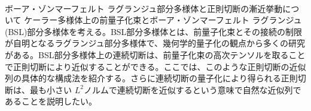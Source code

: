 \documentclass[dvipdfmx,a4paper,12pt]{article}
\theoremstyle{plain} %
\theoremstyle{definition} %
\begin{document}
\\
ボーア・ゾンマーフェルト ラグランジュ部分多様体と正則切断の漸近挙動について
\vskip3mm
ケーラー多様体上の前量子化束とボーア・ゾンマーフェルト ラグランジュ(BSL)部分多様体を考える。BSL部分多様体とは、前量子化束とその接続の制限が自明となるラグランジュ部分多様体で、幾何学的量子化の観点から多くの研究がある。BSL部分多様体上の連続切断は、前量子化束の高次テンソルを取ることで正則切断により近似することができる。ここでは、このような正則切断の近似列の具体的な構成法を紹介する。さらに連続切断の量子化により得られる正則切断は、最も小さい $L^2$ノルムで連続切断を近似するという意味で自然な近似列であることを説明したい。
\vskip8mm
\end{document}
